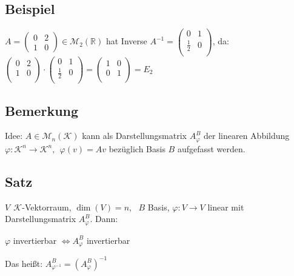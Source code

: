 \documentclass[12pt,titlepage, pdf]{article}
\newcommand{\R}{\mathds{R}}
\newcommand{\K}{\mathcal{K}}
\newcommand{\M}{\mathcal{M}}
\renewcommand{\>}{\rightarrow}
\renewcommand{\*}{\cdot}
\renewcommand{\phi}{\varphi}
\begin{document}
\subsection{Beispiel}
$A = \begin{pmatrix}
0 & 2 \\
1 & 0
\end{pmatrix}\in\M_2(\R)$ hat Inverse $A^{-1} =  \begin{pmatrix}
0 & 1 \\
\frac{1}{2} & 0\\
\end{pmatrix}$, da:\\
$\begin{pmatrix}
0 & 2 \\
1 & 0 \\
\end{pmatrix} \cdot \begin{pmatrix}
0 & 1 \\
\frac{1}{2} & 0 \\
\end{pmatrix} = \begin{pmatrix}
1 & 0  \\
0 & 1 \\
\end{pmatrix} = E_2$
\subsection{Bemerkung}
\label{7.14}
Idee: $A \in \M_n(\K)$ kann als Darstellungsmatrix $A_\phi^B$ der linearen Abbildung $\phi: \K^n \rightarrow \K^n,~~ \phi(v) = Av$ bezüglich Basis $B$ aufgefasst werden.
\subsection{Satz}
$V~~\K$-Vektorraum, $\dim(V) = n,~~~ B$ Basis, $\phi: V \rightarrow V$ linear mit Darstellungsmatrix $A_\phi^B$. Dann:
\begin{center}
	$\phi$ invertierbar $\Leftrightarrow A^B_\phi$ invertierbar
\end{center}
Das heißt:  $A_{\phi^{-1}}^B = (A_\phi^B)^{-1}$
\end{document}
